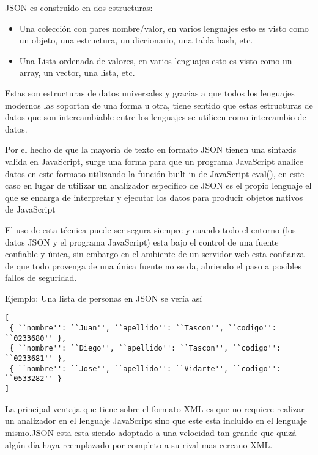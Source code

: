 JSON es construido en dos estructuras:

\begin{itemize}

	\item Una colección con pares nombre/valor, en varios lenguajes esto es visto como un objeto, una estructura, un diccionario, una tabla hash, etc.
	
	\item Una Lista ordenada de valores, en varios lenguajes esto es visto como un array, un vector, una lista, etc.

\end{itemize}

Estas son estructuras de datos universales y gracias a que todos los lenguajes modernos las soportan de una forma u otra, tiene sentido que estas estructuras de datos que son intercambiable entre los lenguajes se utilicen como intercambio de datos.

Por el hecho de que la mayoría de texto en formato JSON tienen una sintaxis valida en JavaScript, surge una forma para que un programa JavaScript analice datos en este formato utilizando la función built-in de JavaScript eval(), en este caso en lugar de utilizar un analizador especifico de JSON es el propio lenguaje el que se encarga de interpretar y ejecutar los datos para producir objetos nativos de JavaScript 

El uso de esta técnica puede ser segura siempre y cuando todo el entorno (los datos JSON y el programa JavaScript) esta bajo el control de una fuente confiable y única, sin embargo en el ambiente de un servidor web esta confianza de que todo provenga de una única fuente no se da, abriendo el paso a posibles fallos de seguridad.

Ejemplo: Una lista de personas en JSON se vería así

\begin{verbatim}
[
 { ``nombre'': ``Juan'', ``apellido'': ``Tascon'', ``codigo'': ``0233680'' },
 { ``nombre'': ``Diego'', ``apellido'': ``Tascon'', ``codigo'': ``0233681'' },
 { ``nombre'': ``Jose'', ``apellido'': ``Vidarte'', ``codigo'': ``0533282'' }
]
\end{verbatim}

La principal ventaja que tiene sobre el formato XML es que no requiere realizar un analizador en el lenguaje JavaScript sino que este esta incluido en el lenguaje mismo.\newline JSON esta esta siendo adoptado a una velocidad tan grande que quizá algún día haya reemplazado por completo a su rival mas cercano XML.


